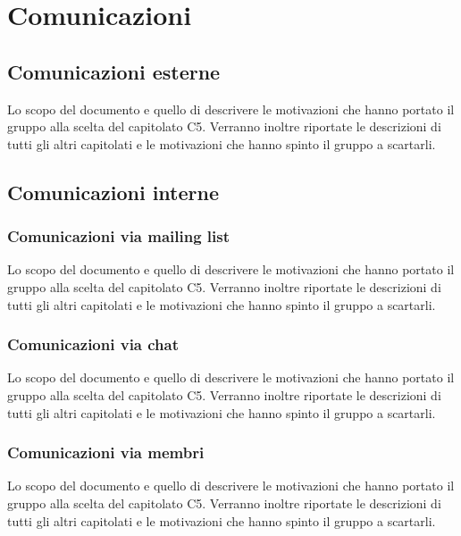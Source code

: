 \section{Comunicazioni}

\subsection{Comunicazioni esterne}
Lo scopo del documento e quello di descrivere le motivazioni che hanno portato il gruppo alla scelta del capitolato C5.
Verranno inoltre riportate le descrizioni di tutti gli altri capitolati e le motivazioni che hanno spinto il gruppo a scartarli.

\subsection{Comunicazioni interne}
\subsubsection{Comunicazioni via mailing list}
Lo scopo del documento e quello di descrivere le motivazioni che hanno portato il gruppo alla scelta del capitolato C5.
Verranno inoltre riportate le descrizioni di tutti gli altri capitolati e le motivazioni che hanno spinto il gruppo a scartarli.
\subsubsection{Comunicazioni via chat}
Lo scopo del documento e quello di descrivere le motivazioni che hanno portato il gruppo alla scelta del capitolato C5.
Verranno inoltre riportate le descrizioni di tutti gli altri capitolati e le motivazioni che hanno spinto il gruppo a scartarli.
\subsubsection{Comunicazioni via membri}
Lo scopo del documento e quello di descrivere le motivazioni che hanno portato il gruppo alla scelta del capitolato C5.
Verranno inoltre riportate le descrizioni di tutti gli altri capitolati e le motivazioni che hanno spinto il gruppo a scartarli.